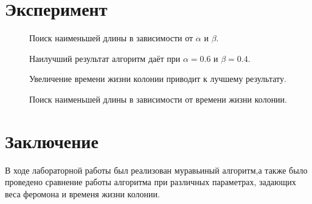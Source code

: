 \documentclass[a4paper,12pt]{article}
\begin{document}
\section{Эксперимент}

\begin{figure}[H]
	\noindent{}
	\caption{Поиск наименьшей длины в зависимости от $\alpha$ и $\beta$.}
	
	Наилучший результат алгоритм даёт при $\alpha = 0.6$ и $\beta = 0.4$.
	
	\noindent{}
	\caption{Поиск наименьшей длины в зависимости от времени жизни колонии.}
	
	Увеличение времени жизни колонии приводит к лучшему результату.
	
\end{figure}

\section{Заключение}
	В ходе лабораторной работы был реализован муравьиный алгоритм,а также было
	проведено сравнение работы алгоритма при различных параметрах, задающих веса
	феромона и временя жизни колонии.
\end{document}
